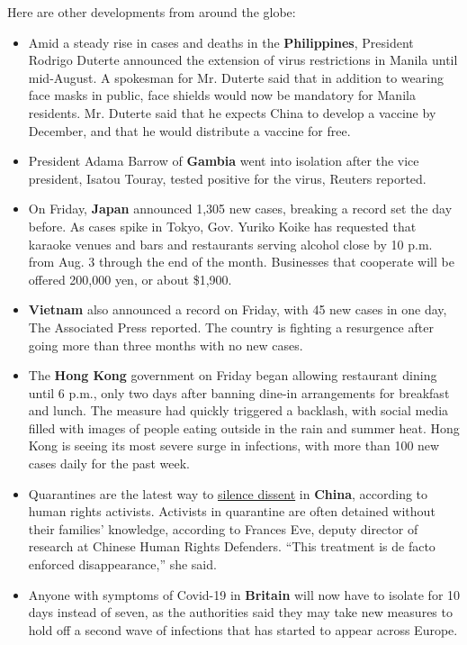 Here are other developments from around the globe:

\begin{itemize}
\tightlist
\item
  Amid a steady rise in cases and deaths in the \textbf{Philippines},
  President Rodrigo Duterte announced the extension of virus
  restrictions in Manila until mid-August. A spokesman for Mr. Duterte
  said that in addition to wearing face masks in public, face shields
  would now be mandatory for Manila residents. Mr. Duterte said that he
  expects China to develop a vaccine by December, and that he would
  distribute a vaccine for free.
\end{itemize}

\begin{itemize}
\item
  President Adama Barrow of \textbf{Gambia} went into isolation after
  the vice president, Isatou Touray, tested positive for the virus,
  Reuters reported.
\item
  On Friday, \textbf{Japan} announced 1,305 new cases, breaking a record
  set the day before. As cases spike in Tokyo, Gov. Yuriko Koike has
  requested that karaoke venues and bars and restaurants serving alcohol
  close by 10 p.m. from Aug. 3 through the end of the month. Businesses
  that cooperate will be offered 200,000 yen, or about \$1,900.
\item
  \textbf{Vietnam} also announced a record on Friday, with 45 new cases
  in one day, The Associated Press reported. The country is fighting a
  resurgence after going more than three months with no new cases.
\item
  The \textbf{Hong Kong} government on Friday began allowing restaurant
  dining until 6 p.m., only two days after banning dine-in arrangements
  for breakfast and lunch. The measure had quickly triggered a backlash,
  with social media filled with images of people eating outside in the
  rain and summer heat. Hong Kong is seeing its most severe surge in
  infections, with more than 100 new cases daily for the past week.
\item
  Quarantines are the latest way to
  \href{https://www.nytimes3xbfgragh.onion/2020/07/30/world/asia/coronavirus-china-qurantine.html}{silence
  dissent} in \textbf{China}, according to human rights activists.
  Activists in quarantine are often detained without their families'
  knowledge, according to Frances Eve, deputy director of research at
  Chinese Human Rights Defenders. ``This treatment is de facto enforced
  disappearance,'' she said.
\item
  Anyone with symptoms of Covid-19 in \textbf{Britain} will now have to
  isolate for 10 days instead of seven, as the authorities said they may
  take new measures to hold off a second wave of infections that has
  started to appear across Europe.
\end{itemize}

